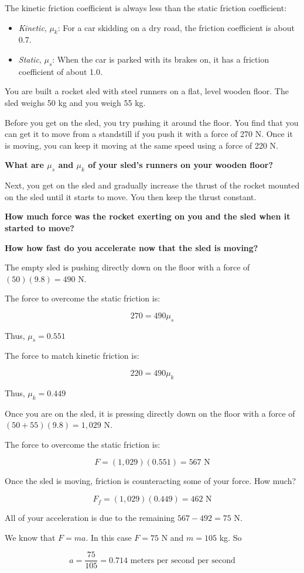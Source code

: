 The kinetic friction coefficient is always less than the static friction coefficient:
\begin{itemize}
\item \textit{Kinetic}, $\mu_k$: For a car skidding on a dry road, the friction coefficient is about 0.7.  
\item \textit{Static}, $\mu_s$: When the car is parked with its brakes on, it has a friction coefficient of about 1.0.
\end{itemize}

\begin{Exercise}[title={Rocket Sled},  label=rocketsled1]
  
You are built a rocket sled with steel runners on a flat, level wooden floor. The sled weighs 50 kg and you weigh 55 kg.

Before you get on the sled,   you try pushing it around the floor. You find that you can get it to move from a
standstill if you push it with a force of 270 N.   Once it is moving,  you can keep it moving at the same speed using a force of 220 N.

\textbf{What are $\mu_s$ and $\mu_k$  of your sled's runners on your wooden floor?}

Next, you get on the sled and gradually increase the thrust of the rocket mounted on the sled until it starts to move. You then keep the thrust constant.

\textbf{How much force was the rocket exerting on you and the sled when it started to move?}

\textbf{How how fast do you accelerate now that the sled is moving?}

\end{Exercise}
\begin{Answer}[ref=rocketsled1]

The empty sled is pushing directly down on the floor with a force of $(50)(9.8) = 490$ N.

The force to overcome the static friction is:

$$270 = 490 \mu_s$$

Thus, $\mu_s = 0.551$

The force to match kinetic friction is:

$$220 = 490 \mu_k$$

Thus, $\mu_k = 0.449$

Once you are on the sled, it is pressing directly down on the floor with a force of $(50  + 55)(9.8) = 1,029$ N.

The force to overcome the static friction is:

$$F = (1,029)(0.551) = 567 \text{ N}$$

Once the sled is moving, friction is counteracting some of your force. How much?

$$F_f = (1,029)(0.449) = 462 \text{ N}$$

All of your acceleration is due to the remaining $567 - 492 = 75$ N.

We know that $F = ma$. In this case $F = 75$ N and $m = 105$ kg. So

$$a = \frac{75}{105} = 0.714 \text{ meters per second per second}$$

\end{Answer}

